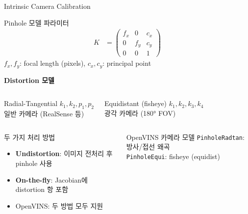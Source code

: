 \begin{frame}[shrink=10]{Intrinsic Camera Calibration}
  \begin{block}{Pinhole 모델 파라미터}
    \begin{align*}
      K &= \begin{pmatrix} f_x & 0 & c_x \\ 0 & f_y & c_y \\ 0 & 0 & 1 \end{pmatrix}
    \end{align*}
    $f_x, f_y$: focal length (pixels), $c_x, c_y$: principal point
  \end{block}
  \textbf{Distortion 모델}
  \vspace{0.2em}
  \begin{columns}[T]
      \begin{block}{Radial-Tangential}
        $k_1, k_2, p_1, p_2$\\
        일반 카메라 (RealSense 등)
      \end{block}
      \begin{block}{Equidistant (fisheye)}
        $k_1, k_2, k_3, k_4$\\
        광각 카메라 (180° FOV)
      \end{block}
  \end{columns}
  \begin{columns}[T]
      \begin{exampleblock}{두 가지 처리 방법}
        \begin{itemize}
          \item \textbf{Undistortion}: 이미지 전처리 후 pinhole 사용
          \item \textbf{On-the-fly}: Jacobian에 distortion 항 포함
          \item OpenVINS: 두 방법 모두 지원
        \end{itemize}
      \end{exampleblock}
      \begin{exampleblock}{OpenVINS 카메라 모델}
        \texttt{PinholeRadtan}: 방사/접선 왜곡\\
        \texttt{PinholeEqui}: fisheye (equidist)
      \end{exampleblock}
  \end{columns}
\end{frame}



